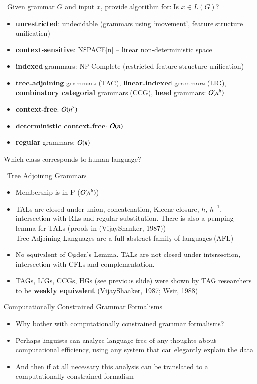\documentclass[landscape]{slides}
\def\dbend{{\manual\char127}}   %
\begin{document}
\begin{slide}{\dbend\ Given grammar $G$ and input $x$, provide algorithm for: Is $x \in L(G)$?}
{\small \begin{itemize}
\item {\bf unrestricted}: {\color{red} undecidable} (grammars using `movement', feature structure unification)
\item {\bf context-sensitive}: {\color{red} NSPACE[n] -- linear non-deterministic space}
\item {\bf indexed} grammars: {\color{red} NP-Complete} (restricted feature structure unification)
\item {\bf tree-adjoining} grammars (TAG), {\bf linear-indexed}
  grammars (LIG), {\bf combinatory categorial} grammars (CCG), {\bf
  head} grammars: {\color{red} ${\cal O}(n^6)$} 
\item {\bf context-free}: {\color{red} ${\cal O}(n^3)$}
\item {\bf deterministic context-free}: {\color{red} ${\cal O}(n)$}
\item {\bf regular} grammars: {\color{red} ${\cal O}(n)$}
\end{itemize}}
Which class corresponds to human language?
\end{slide}

\begin{slide}{\dbend\ \underline{Tree Adjoining Grammars}}
\begin{itemize}
\item Membership is in P (${\cal O}(n^6)$)
\item TALs are closed under union, concatenation, Kleene closure, $h$,
  $h^{-1}$, intersection with RLs and regular substitution. There is
  also a pumping lemma for TALs (proofs in (VijayShanker, 1987))  \\
Tree Adjoining Languages are a full abstract family of languages
  (AFL) 
\item No equivalent of Ogden's Lemma. TALs are not closed under
  intersection, intersection with CFLs and complementation.
\item TAGs, LIGs, CCGs, HGs (see previous slide) were shown by TAG
  researchers to be {\bf weakly equivalent} (VijayShanker, 1987; Weir, 1988)
\end{itemize}
\end{slide}

\begin{slide}{\underline{Computationally Constrained Grammar Formalisms}}
\begin{itemize}
\item Why bother with computationally constrained grammar formalisms?
\item Perhaps linguists can analyze language free of any thoughts about computational efficiency, using any system that can elegantly explain the data
\item And then if at all necessary this analysis can be translated to a computationally constrained formalism
\end{itemize}
\end{slide}
\end{document}
